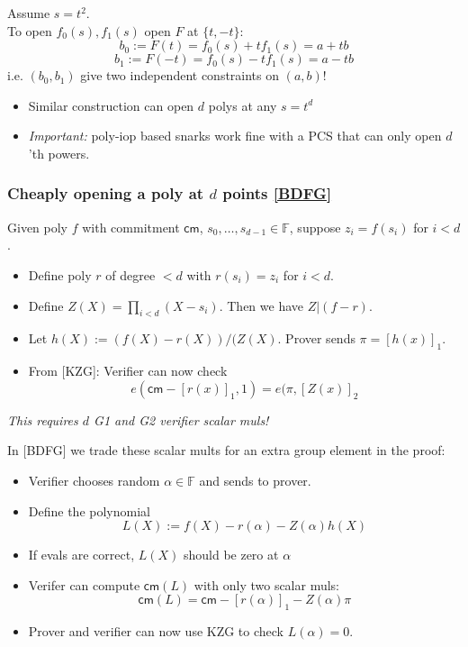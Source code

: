 \documentclass[shadesubsections,compress,14pt,mathserif]{beamer}
\newcommand{\F}{\ensuremath{\mathbb F}}
\newcommand{\enc}[1]{\ensuremath{\left[#1\right ]_1}}
\newcommand{\enctwo}[1]{\ensuremath{\left[#1\right ]_2}}
\newcommand{\cm}{\ensuremath{\mathsf{cm}}}
\newcommand{\defeq}{\ensuremath{:=}}
\begin{document}
\begin{frame}
Assume $s=t^2$.\\
To open $f_0(s),f_1(s)$ open $F$ at $\{t,-t\}$:\\ \pause
\[b_0\defeq F(t) = f_0(s)+t f_1(s)=a+tb\]
\[b_1\defeq F(-t) = f_0(s)-t f_1(s)=a-tb\]
i.e. $(b_0,b_1)$ give two independent constraints on $(a,b)$!
 \vspace{0.2in}
\begin{itemize}
 \item Similar construction can open $d$ polys at any $s=t^d$
 \item \textit{Important:} poly-iop based snarks work fine with a PCS that can only open $d$'th powers.
\end{itemize}

\end{frame}
 
\begin{frame}
\frametitle{Cheaply opening a poly at $d$ points \href{https://eprint.iacr.org/2020/081.pdf}{[BDFG]}}
Given poly $f$ with commitment $\cm$, $s_0,\ldots,s_{d-1}\in \F$, suppose $z_i=f(s_i)$ for $i<d$.
\begin{itemize}
 \item Define poly $r$ of degree $<d$ with
$r(s_i)=z_i$ for $i<d$.\pause
\item Define $Z(X)=\prod_{i<d} (X-s_i)$. Then we have $Z|(f-r)$. \pause
\item Let $h(X)\defeq (f(X)-r(X))/(Z(X)$. Prover sends $\pi = \enc{h(x)}$. \pause
\item From [KZG]: Verifier can now check
\[e(\cm-\enc{r(x)},1)=e(\pi,\enctwo{Z(x)}\]\pause 
\end{itemize}
\textit{This requires $d$ G1 and G2 verifier scalar muls!}
\end{frame}
\begin{frame}
In [BDFG] we trade these scalar mults for an extra group element in the proof:
\begin{itemize}
 \item Verifier chooses random $\alpha\in \F$ and sends to prover.
 \item Define the polynomial 
 \[L(X)\defeq f(X)-r(\alpha)-Z(\alpha)h(X)\]\pause
\item If evals are correct, $L(X)$ should be zero at $\alpha$\pause
\item Verifer can compute $\cm(L)$ with only two scalar muls:
\[\cm(L)= \cm -\enc{r(\alpha)}-Z(\alpha)\pi\]
\item Prover and verifier can now use KZG to check $L(\alpha)=0$.
\end{itemize}
\end{frame}
\end{document}
